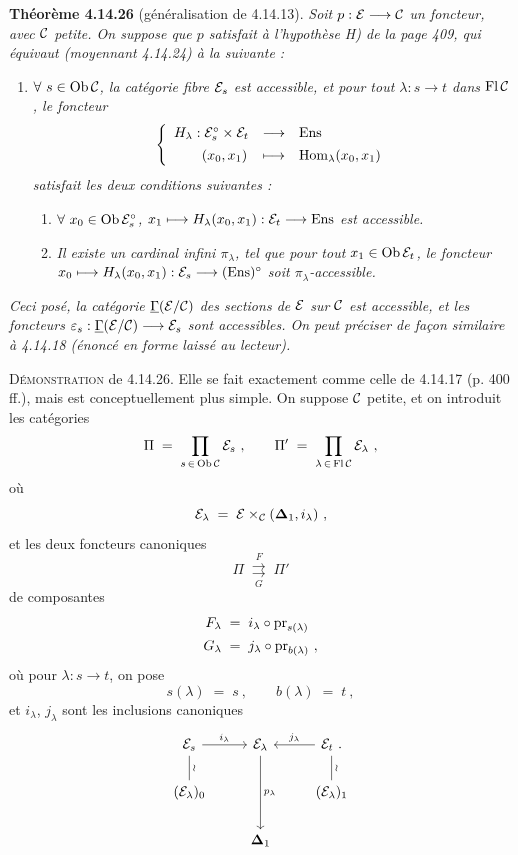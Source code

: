 \textbf{Théorème 4.14.26} (généralisation de 4.14.13). \textit{Soit $p : \mathcal{E} \longrightarrow \mathcal{C}$ un foncteur, avec $\mathcal{C}$ petite. On suppose que $p$ satisfait à l'hypothèse H) de la page 409, qui équivaut (moyennant 4.14.24) à la suivante :}
\begin{enumerate}
\item[\textit{H$'$)}] \textit{$\forall\ s \in \operatorname{Ob}\mathcal{C}$, la catégorie fibre $\mathcal{E}_s$ est accessible, et pour tout $\lambda : s \longrightarrow t$ dans $\operatorname{Fl}\mathcal{C}$, le foncteur}
\[
\left\{
\begin{array}{lcl}
H_\lambda : \mathcal{E}_s^\circ \times \mathcal{E}_t & \longrightarrow & \mathrm{Ens}\\[1ex]
\qquad (x_0,x_1) & \longmapsto & \operatorname{Hom}_\lambda(x_0,x_1)
\end{array}
\right.
\]
\textit{satisfait les deux conditions suivantes :}
\begin{enumerate}
\item[\textit{a)}] \textit{$\forall\ x_0 \in \operatorname{Ob}\mathcal{E}_s^\circ$, $x_1 \longmapsto H_\lambda(x_0,x_1) : \mathcal{E}_t \longrightarrow \mathrm{Ens}$ est accessible.}
\item[\textit{b)}] \textit{Il existe un cardinal infini $\pi_\lambda$, tel que pour tout $x_1 \in \operatorname{Ob}\mathcal{E}_t$, le foncteur $x_0 \longmapsto H_\lambda(x_0,x_1) : \mathcal{E}_s \longrightarrow (\mathrm{Ens})^\circ$ soit $\pi_\lambda$-accessible.}
\end{enumerate}
\end{enumerate}
\textit{Ceci posé, la catégorie $\underline{\Gamma}(\mathcal{E}/\mathcal{C})$ des sections de $\mathcal{E}$ sur $\mathcal{C}$ est accessible, et les foncteurs $\varepsilon_s : \underline{\Gamma}(\mathcal{E}/\mathcal{C}) \longrightarrow \mathcal{E}_s$ sont accessibles. On peut préciser de façon similaire à 4.14.18 (énoncé en forme laissé au lecteur).}

\textsc{Démonstration} de 4.14.26. Elle se fait exactement comme celle de 4.14.17 (p. 400 ff.), mais est conceptuellement plus simple. On suppose $\mathcal{C}$ petite, et on introduit les catégories
\[
\Pi \;=\; \prod_{s\,\in\,\operatorname{Ob}\mathcal{C}} \mathcal{E}_s\ , \qquad \Pi' \;=\; \prod_{\lambda\,\in\,\operatorname{Fl}\mathcal{C}} \mathcal{E}_\lambda\ ,
\]
où
\[
\mathcal{E}_\lambda \;=\; \mathcal{E} \times_{\mathcal{C}} (\boldsymbol{\Delta}_1, i_\lambda)\ ,
\]
et les deux foncteurs canoniques
\[
\Pi \;\underset{G}{\overset{F}{\rightrightarrows}}\; \Pi'
\]
de composantes
\[
\begin{aligned}
F_\lambda \;&=\; i_\lambda \circ \mathrm{pr}_{s(\lambda)}\\
G_\lambda \;&=\; j_\lambda \circ \mathrm{pr}_{b(\lambda)}\ ,
\end{aligned}
\]
où pour $\lambda : s \longrightarrow t$, on pose
\[
s(\lambda) \;=\; s\ , \qquad b(\lambda) \;=\; t\ ,
\]
et $i_\lambda$, $j_\lambda$ sont les inclusions canoniques
\[
\begin{tikzcd}
\cE_s \arrow[r,"i_\lambda"] \arrow[d,dash,"\wr"] & \cE_\lambda \arrow[dd,"p_\lambda"] & \cE_t\ . \arrow[l,"j_\lambda"'] \arrow[d,dash,"\wr"] \\
(\cE_\lambda)_0 & & (\cE_\lambda)_1 \\
& \boldsymbol{\Delta}_1 &
\end{tikzcd}
\]

